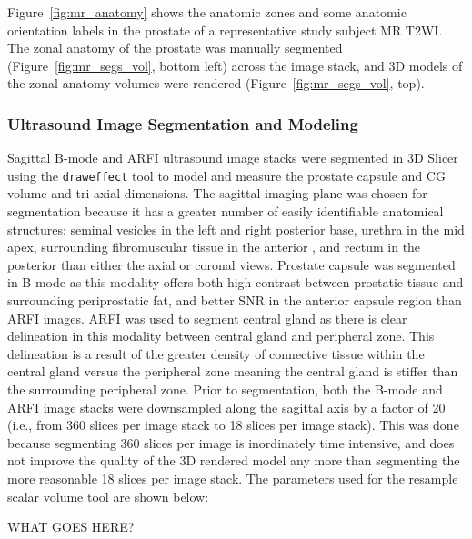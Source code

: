 Figure~\ref{fig:mr_anatomy} shows the anatomic zones and some anatomic
orientation labels in the prostate of a representative study subject MR T2WI.  The
zonal anatomy of the prostate was manually segmented
(Figure~\ref{fig:mr_segs_vol}, bottom left) across the image stack, and 3D
models of the zonal anatomy volumes were rendered
(Figure~\ref{fig:mr_segs_vol}, top).





\subsubsection{Ultrasound Image Segmentation and Modeling}
Sagittal B-mode and ARFI ultrasound image stacks were segmented in 3D Slicer
using the \verb+draweffect+ tool to model and measure the prostate capsule and CG
volume and tri-axial dimensions.  The sagittal imaging plane was chosen for
segmentation because it has a greater number of easily identifiable anatomical
structures:  seminal vesicles in the left and right posterior base, urethra in
the mid apex, surrounding fibromuscular tissue in the anterior , and rectum in
the posterior  than either the axial or coronal views. Prostate capsule was
segmented in B-mode as this modality offers both high contrast between
prostatic tissue and surrounding periprostatic fat, and better SNR in the
anterior capsule region than ARFI images. ARFI was used to segment central gland as
there is clear delineation in this modality between central gland and
peripheral zone. This delineation is a result of the greater density of
connective tissue within the central gland versus the peripheral zone meaning
the central gland is stiffer than the surrounding peripheral zone.  Prior to
segmentation, both the B-mode and ARFI image stacks were downsampled along the
sagittal axis by a factor of 20 (i.e., from 360 slices per image stack to 18
slices per image stack). This was done because segmenting 360 slices per image
is inordinately time intensive, and does not improve the quality of the 3D
rendered model any more than segmenting the more reasonable 18 slices per image
stack. The parameters used for the resample scalar volume tool are shown below:

WHAT GOES HERE?

